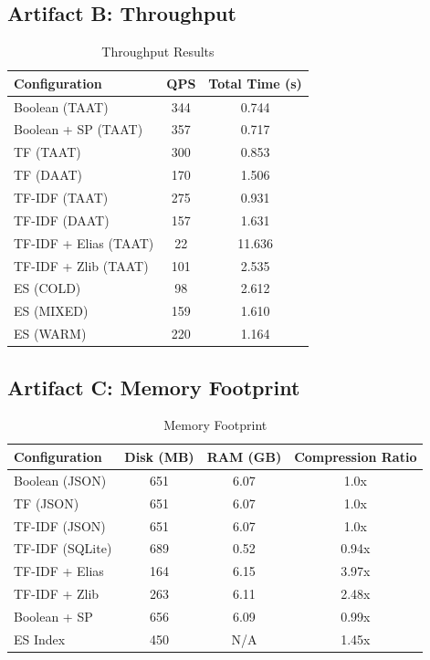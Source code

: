 \documentclass[12pt,a4paper]{article}
\begin{document}
\subsection{Artifact B: Throughput}

\begin{table}[H]
\centering
\begin{tabular}{lcc}
\toprule
\textbf{Configuration} & \textbf{QPS} & \textbf{Total Time (s)} \\
\midrule
Boolean (TAAT) & 344 & 0.744 \\
Boolean + SP (TAAT) & 357 & 0.717 \\
TF (TAAT) & 300 & 0.853 \\
TF (DAAT) & 170 & 1.506 \\
TF-IDF (TAAT) & 275 & 0.931 \\
TF-IDF (DAAT) & 157 & 1.631 \\
TF-IDF + Elias (TAAT) & 22 & 11.636 \\
TF-IDF + Zlib (TAAT) & 101 & 2.535 \\
\midrule
ES (COLD) & 98 & 2.612 \\
ES (MIXED) & 159 & 1.610 \\
ES (WARM) & 220 & 1.164 \\
\bottomrule
\end{tabular}
\caption{Throughput Results}
\end{table}

\subsection{Artifact C: Memory Footprint}

\begin{table}[H]
\centering
\begin{tabular}{lccc}
\toprule
\textbf{Configuration} & \textbf{Disk (MB)} & \textbf{RAM (GB)} & \textbf{Compression Ratio} \\
\midrule
Boolean (JSON) & 651 & 6.07 & 1.0x \\
TF (JSON) & 651 & 6.07 & 1.0x \\
TF-IDF (JSON) & 651 & 6.07 & 1.0x \\
TF-IDF (SQLite) & 689 & 0.52 & 0.94x \\
TF-IDF + Elias & 164 & 6.15 & 3.97x \\
TF-IDF + Zlib & 263 & 6.11 & 2.48x \\
Boolean + SP & 656 & 6.09 & 0.99x \\
\midrule
ES Index & 450 & N/A & 1.45x \\
\bottomrule
\end{tabular}
\caption{Memory Footprint}
\end{table}
\end{document}
